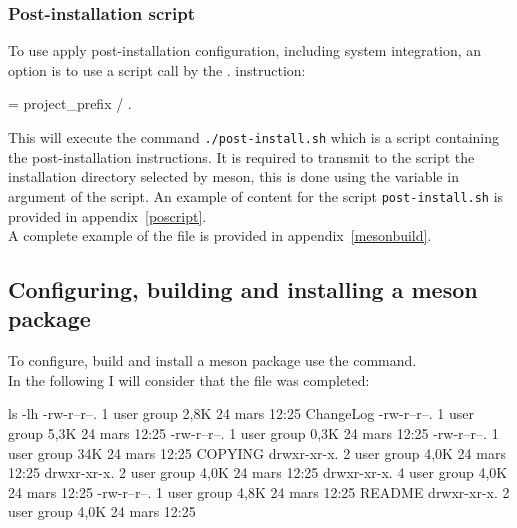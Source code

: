 \subsubsection*{Post-installation script}

To use apply post-installation configuration, including system integration, an option is to use a
script call by the . instruction:
\begin{script}
 = project\_prefix / 
.
\end{script}
This will execute the command \texttt{./post-install.sh} which is a script containing the post-installation instructions. 
It is required to transmit to the script the installation directory selected by meson, this is done using the variable  in argument of the script. 
An example of content for the script \texttt{post-install.sh} is provided in appendix~\ref{poscript}. \\[0.25cm]
A complete example of the file  is provided in appendix~\ref{mesonbuild}.

\subsection{Configuring, building and installing a meson package}

To configure, build and install a meson package use the  command. \\
In the following I will consider that the file  was completed: 
{\footnotesize{
\begin{script}
 ls -lh
-rw-r--r--. 1 user group 2,8K 24 mars  12:25 ChangeLog
-rw-r--r--. 1 user group 5,3K 24 mars  12:25 
-rw-r--r--. 1 user group 0,3K 24 mars  12:25  
-rw-r--r--. 1 user group  34K 24 mars  12:25 COPYING
drwxr-xr-x. 2 user group 4,0K 24 mars  12:25 
drwxr-xr-x. 2 user group 4,0K 24 mars  12:25 
drwxr-xr-x. 4 user group 4,0K 24 mars  12:25 
-rw-r--r--. 1 user group 4,8K 24 mars  12:25 README
drwxr-xr-x. 2 user group 4,0K 24 mars  12:25 
\end{script}
}}

